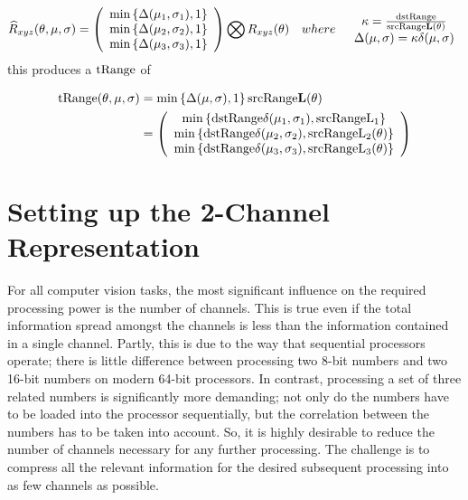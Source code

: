 \begin{equation}\label{eq:CombinedRotation}
 \widehat{R}_{xyz}(\theta,\mu,\sigma) =
\left(
\begin{array}{c}
\min\left\{\Delta(\mu_1,\sigma_1), 1 \right\} \\
\min\left\{\Delta(\mu_2,\sigma_2), 1 \right\}  \\
\min\left\{\Delta(\mu_3,\sigma_3), 1 \right\}  \\
\end{array}
\right)
\bigotimes
R_{xyz}(\theta) \quad where \quad
\begin{array}{c}
\kappa = \frac{\text{dstRange} }{\text{srcRange} \mathbf{L}(\theta)} \\
\Delta(\mu,\sigma) = \kappa \delta(\mu,\sigma)
\end{array}
\end{equation}
this produces a $\text{tRange}$ of

\begin{equation}\label{eq:CombinedRotation}
\begin{aligned}
 \text{tRange}(\theta,\mu,\sigma) &= \min\left\{\Delta(\mu,\sigma), 1 \right\} \text{srcRange} \mathbf{L}(\theta) \\
 &= 
\left(
\begin{array}{c}
\min\left\{\text{dstRange} \delta(\mu_1,\sigma_1), \text{srcRange} \text{L}_1 \right\} \\
\min\left\{\text{dstRange} \delta(\mu_2,\sigma_2), \text{srcRange} \text{L}_2(\theta) \right\}  \\
\min\left\{\text{dstRange} \delta(\mu_3,\sigma_3), \text{srcRange} \text{L}_3(\theta) \right\}  \\
\end{array}
\right)
\end{aligned}
\end{equation}
\section{Setting up the 2-Channel Representation}\label{sec:SettingUp2-ChannelRepresentation}

For all computer vision tasks, the most significant influence on the required processing power is the number of channels. This is true even if the total information spread amongst the channels is less than the information contained in a single channel. Partly, this is due to the way that sequential processors operate; there is little difference between processing two 8-bit numbers and two 16-bit numbers on modern 64-bit processors. In contrast, processing a set of three related numbers is significantly more demanding; not only do the numbers have to be loaded into the processor sequentially, but the correlation between the numbers has to be taken into account. So, it is highly desirable to reduce the number of channels necessary for any further processing. The challenge is to compress all the relevant information for the desired subsequent processing into as few channels as possible.

